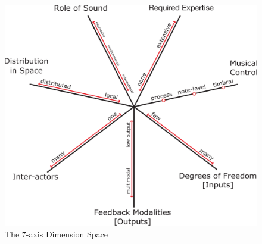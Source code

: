 {{\begin{figure}[t]
\centering
\includegraphics[width=\columnwidth]{figures/7axes}
\caption{The 7-axis Dimension Space}
\label{Birnbaum:fig:7axes}
\end{figure}

}}
